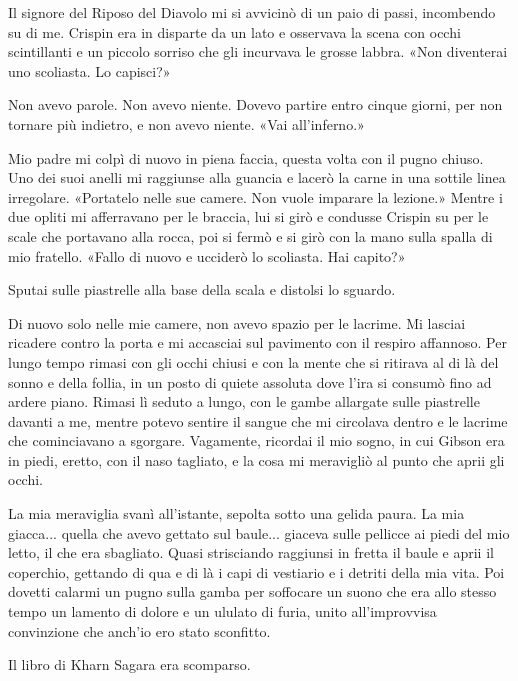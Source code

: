 Il signore del Riposo del Diavolo mi si avvicinò di un paio di passi,
incombendo su di me. Crispin era in disparte da un lato e osservava la
scena con occhi scintillanti e un piccolo sorriso che gli incurvava le
grosse labbra. «Non diventerai uno scoliasta. Lo capisci?»

Non avevo parole. Non avevo niente. Dovevo partire entro cinque giorni,
per non tornare più indietro, e non avevo niente. «Vai all'inferno.»

Mio padre mi colpì di nuovo in piena faccia, questa volta con il pugno
chiuso. Uno dei suoi anelli mi raggiunse alla guancia e lacerò la carne
in una sottile linea irregolare. «Portatelo nelle sue camere. Non vuole
imparare la lezione.» Mentre i due opliti mi afferravano per le braccia,
lui si girò e condusse Crispin su per le scale che portavano alla rocca,
poi si fermò e si girò con la mano sulla spalla di mio fratello. «Fallo
di nuovo e ucciderò lo scoliasta. Hai capito?»

Sputai sulle piastrelle alla base della scala e distolsi lo sguardo.

\begin{figure}
	\centering
	\def\svgwidth{\columnwidth}
	\scalebox{0.2}{}
\end{figure}

Di nuovo solo nelle mie camere, non avevo spazio per le lacrime. Mi
lasciai ricadere contro la porta e mi accasciai sul pavimento con il
respiro affannoso. Per lungo tempo rimasi con gli occhi chiusi e con la
mente che si ritirava al di là del sonno e della follia, in un posto di
quiete assoluta dove l'ira si consumò fino ad ardere piano. Rimasi lì
seduto a lungo, con le gambe allargate sulle piastrelle davanti a me,
mentre potevo sentire il sangue che mi circolava dentro e le lacrime che
cominciavano a sgorgare. Vagamente, ricordai il mio sogno, in cui Gibson
era in piedi, eretto, con il naso tagliato, e la cosa mi meravigliò al
punto che aprii gli occhi.

La mia meraviglia svanì all'istante, sepolta sotto una gelida paura. La
mia giacca... quella che avevo gettato sul baule... giaceva sulle
pellicce ai piedi del mio letto, il che era sbagliato. Quasi strisciando
raggiunsi in fretta il baule e aprii il coperchio, gettando di qua e di
là i capi di vestiario e i detriti della mia vita. Poi dovetti calarmi
un pugno sulla gamba per soffocare un suono che era allo stesso tempo un
lamento di dolore e un ululato di furia, unito all'improvvisa
convinzione che anch'io ero stato sconfitto.

Il libro di Kharn Sagara era scomparso.
